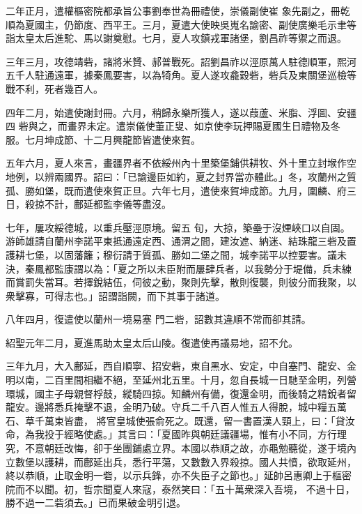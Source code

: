 \begin{pinyinscope}
 二年正月，遣權樞密院都承旨公事劉奉世為冊禮使，崇儀副使崔
 象先副之，冊乾順為夏國主，仍節度、西平王。三月，夏遣大使映吳嵬名諭密、副使廣樂毛示聿等詣太皇太后進駝、馬以謝奠慰。七月，夏人攻鎮戎軍諸堡，劉昌祚等禦之而退。



 三年三月，攻德靖砦，諸將米贇、郝普戰死。詔劉昌祚以涇原萬人駐德順軍，熙河五千人駐通遠軍，據秦鳳要害，以為犄角。夏人遂攻龕穀砦，砦兵及東關堡巡檢等戰不利，死者幾百人。



 四年二月，始遣使謝封冊。六月，稍歸永樂所獲人，遂以葭蘆、米脂、浮圖、安疆四
 砦與之，而畫界未定。遣崇儀使董正叟、如京使李玩押賜夏國生日禮物及冬服。七月坤成節、十二月興龍節皆遣使來賀。



 五年六月，夏人來言，畫疆界者不依綏州內十里築堡鋪供耕牧、外十里立封堠作空地例，以辨兩國界。詔曰：「已諭邊臣如約，夏之封界當亦體此。」冬，攻蘭州之質孤、勝如堡，既而遣使來賀正旦。六年七月，遣使來賀坤成節。九月，圍麟、府三日，殺掠不計，鄜延都監李儀等盡沒。



 七年，屢攻綏德城，以重兵壓涇原境。留五
 旬，大掠，築壘于沒煙峽口以自固。游師雄請自蘭州李諾平東抵通遠定西、通渭之間，建汝遮、納迷、結珠龍三砦及置護耕七堡，以固藩籬；穆衍請于質孤、勝如二堡之間，城李諾平以控要害。議未決，秦鳳都監康謂以為：「夏之所以未臣附而屢肆兵者，以我勢分于堤備，兵未練而賞罰失當耳。若擇銳結伍，伺彼之動，聚則先擊，散則復襲，則彼分而我聚，以衆擊寡，可得志也。」詔謂詣闕，而下其事于諸道。



 八年四月，復遣使以蘭州一境易塞
 門二砦，詔數其違順不常而卻其請。



 紹聖元年二月，夏進馬助太皇太后山陵。復遣使再議易地，詔不允。



 三年九月，大入鄜延，西自順寧、招安砦，東自黑水、安定，中自塞門、龍安、金明以南，二百里間相繼不絕，至延州北五里。十月，忽自長城一日馳至金明，列營環城，國主子母親督桴鼓，縱騎四掠。知麟州有備，復還金明，而後騎之精銳者留龍安。邊將悉兵掩擊不退，金明乃破。守兵二千八百人惟五人得脫，城中糧五萬石、草千萬束皆盡，
 將官皇城使張俞死之。既還，留一書置漢人頸上，曰：「貸汝命，為我投于經略使處。」其言曰：「夏國昨與朝廷議疆場，惟有小不同，方行理究，不意朝廷改悔，卻于坐團鋪處立界。本國以恭順之故，亦黽勉聽從，遂于境內立數堡以護耕，而鄜延出兵，悉行平蕩，又數數入界殺掠。國人共憤，欲取延州，終以恭順，止取金明一砦，以示兵鋒，亦不失臣子之節也。」延帥呂惠卿上于樞密院而不以聞。初，哲宗聞夏人來寇，泰然笑曰：「五十萬衆深入吾境，
 不過十日，勝不過一二砦須去。」已而果破金明引退。




\end{pinyinscope}
